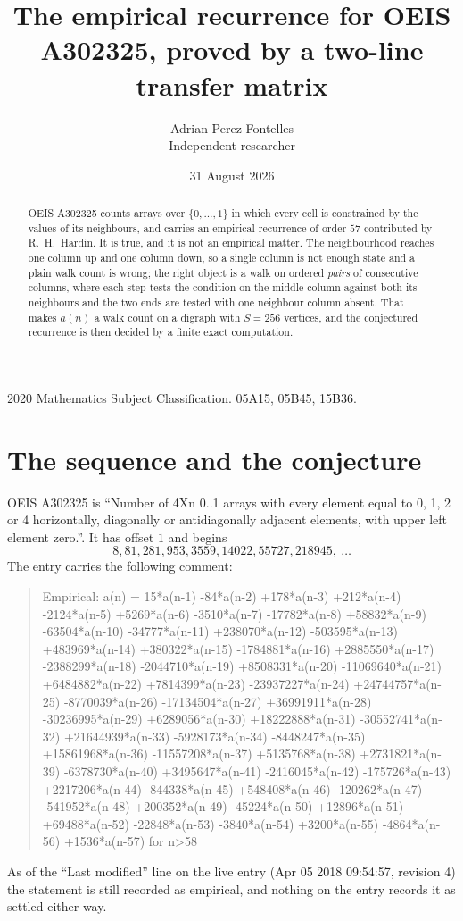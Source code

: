 \documentclass[11pt,a4paper]{article}
\title{The empirical recurrence for OEIS A302325, proved by a two-line transfer matrix}
\author{Adrian Perez Fontelles\\ \small Independent researcher}
\date{31 August 2026}
\theoremstyle{plain}
\theoremstyle{definition}
\begin{document}
\maketitle

\begin{abstract}
OEIS A302325 counts arrays over $\{0,\dots,1\}$ in which every cell is constrained by the
values of its neighbours, and carries an empirical recurrence of order $57$ contributed
by R.~H.~Hardin. It is true, and it is not an empirical matter. The neighbourhood reaches one
column up and one column down, so a single column is not enough state and a plain walk count
is wrong; the right object is a walk on ordered \emph{pairs} of consecutive columns, where
each step tests the condition on the middle column against both its neighbours and the two
ends are tested with one neighbour column absent. That makes $a(n)$ a walk count on a digraph
with $S=256$ vertices, and the conjectured recurrence is then decided by a finite exact
computation.
\end{abstract}

\noindent\small 2020 Mathematics Subject Classification. 05A15, 05B45, 15B36.\normalsize

\section{The sequence and the conjecture}

OEIS A302325 is ``Number of 4Xn 0..1 arrays with every element equal to 0, 1, 2 or 4 horizontally, diagonally or antidiagonally adjacent elements, with upper left element zero.''. It has offset $1$ and begins
\[
8, 81, 281, 953, 3559, 14022, 55727, 218945,\ \dots
\]
The entry carries the following comment:
\begin{quote}\small
Empirical: a(n) = 15*a(n-1) -84*a(n-2) +178*a(n-3) +212*a(n-4) -2124*a(n-5) +5269*a(n-6) -3510*a(n-7) -17782*a(n-8) +58832*a(n-9) -63504*a(n-10) -34777*a(n-11) +238070*a(n-12) -503595*a(n-13) +483969*a(n-14) +380322*a(n-15) -1784881*a(n-16) +2885550*a(n-17) -2388299*a(n-18) -2044710*a(n-19) +8508331*a(n-20) -11069640*a(n-21) +6484882*a(n-22) +7814399*a(n-23) -23937227*a(n-24) +24744757*a(n-25) -8770039*a(n-26) -17134504*a(n-27) +36991911*a(n-28) -30236995*a(n-29) +6289056*a(n-30) +18222888*a(n-31) -30552741*a(n-32) +21644939*a(n-33) -5928173*a(n-34) -8448247*a(n-35) +15861968*a(n-36) -11557208*a(n-37) +5135768*a(n-38) +2731821*a(n-39) -6378730*a(n-40) +3495647*a(n-41) -2416045*a(n-42) -175726*a(n-43) +2217206*a(n-44) -844338*a(n-45) +548408*a(n-46) -120262*a(n-47) -541952*a(n-48) +200352*a(n-49) -45224*a(n-50) +12896*a(n-51) +69488*a(n-52) -22848*a(n-53) -3840*a(n-54) +3200*a(n-55) -4864*a(n-56) +1536*a(n-57) for n>58
\end{quote}
As of the ``Last modified'' line on the live entry (Apr 05 2018 09:54:57, revision 4) the statement is
still recorded as empirical, and nothing on the entry records it as settled either way.
\end{document}
